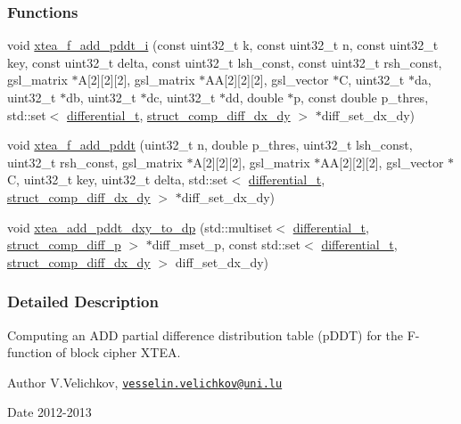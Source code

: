 \subsubsection*{\-Functions}
\begin{DoxyCompactItemize}
\item 
void \hyperlink{xtea-f-add-pddt_8cc_a6dded7b175a5f072d48becf43f3c9db1}{xtea\-\_\-f\-\_\-add\-\_\-pddt\-\_\-i} (const uint32\-\_\-t k, const uint32\-\_\-t n, const uint32\-\_\-t key, const uint32\-\_\-t delta, const uint32\-\_\-t lsh\-\_\-const, const uint32\-\_\-t rsh\-\_\-const, gsl\-\_\-matrix $\ast$\-A\mbox{[}2\mbox{]}\mbox{[}2\mbox{]}\mbox{[}2\mbox{]}, gsl\-\_\-matrix $\ast$\-A\-A\mbox{[}2\mbox{]}\mbox{[}2\mbox{]}\mbox{[}2\mbox{]}, gsl\-\_\-vector $\ast$\-C, uint32\-\_\-t $\ast$da, uint32\-\_\-t $\ast$db, uint32\-\_\-t $\ast$dc, uint32\-\_\-t $\ast$dd, double $\ast$p, const double p\-\_\-thres, std\-::set$<$ \hyperlink{structdifferential__t}{differential\-\_\-t}, \hyperlink{structstruct__comp__diff__dx__dy}{struct\-\_\-comp\-\_\-diff\-\_\-dx\-\_\-dy} $>$ $\ast$diff\-\_\-set\-\_\-dx\-\_\-dy)
\item 
void \hyperlink{xtea-f-add-pddt_8cc_a98d696f2047ccb8b1a07f777a55a1168}{xtea\-\_\-f\-\_\-add\-\_\-pddt} (uint32\-\_\-t n, double p\-\_\-thres, uint32\-\_\-t lsh\-\_\-const, uint32\-\_\-t rsh\-\_\-const, gsl\-\_\-matrix $\ast$\-A\mbox{[}2\mbox{]}\mbox{[}2\mbox{]}\mbox{[}2\mbox{]}, gsl\-\_\-matrix $\ast$\-A\-A\mbox{[}2\mbox{]}\mbox{[}2\mbox{]}\mbox{[}2\mbox{]}, gsl\-\_\-vector $\ast$\-C, uint32\-\_\-t key, uint32\-\_\-t delta, std\-::set$<$ \hyperlink{structdifferential__t}{differential\-\_\-t}, \hyperlink{structstruct__comp__diff__dx__dy}{struct\-\_\-comp\-\_\-diff\-\_\-dx\-\_\-dy} $>$ $\ast$diff\-\_\-set\-\_\-dx\-\_\-dy)
\item 
void \hyperlink{xtea-f-add-pddt_8cc_a84e14ae4c2be82a4895dfa91f012e9e3}{xtea\-\_\-add\-\_\-pddt\-\_\-dxy\-\_\-to\-\_\-dp} (std\-::multiset$<$ \hyperlink{structdifferential__t}{differential\-\_\-t}, \hyperlink{structstruct__comp__diff__p}{struct\-\_\-comp\-\_\-diff\-\_\-p} $>$ $\ast$diff\-\_\-mset\-\_\-p, const std\-::set$<$ \hyperlink{structdifferential__t}{differential\-\_\-t}, \hyperlink{structstruct__comp__diff__dx__dy}{struct\-\_\-comp\-\_\-diff\-\_\-dx\-\_\-dy} $>$ diff\-\_\-set\-\_\-dx\-\_\-dy)
\end{DoxyCompactItemize}


\subsubsection{\-Detailed \-Description}
\-Computing an \-A\-D\-D partial difference distribution table (p\-D\-D\-T) for the \-F-\/function of block cipher \-X\-T\-E\-A. \begin{DoxyAuthor}{\-Author}
\-V.\-Velichkov, \href{mailto:vesselin.velichkov@uni.lu}{\tt vesselin.\-velichkov@uni.\-lu} 
\end{DoxyAuthor}
\begin{DoxyDate}{\-Date}
2012-\/2013 
\end{DoxyDate}


